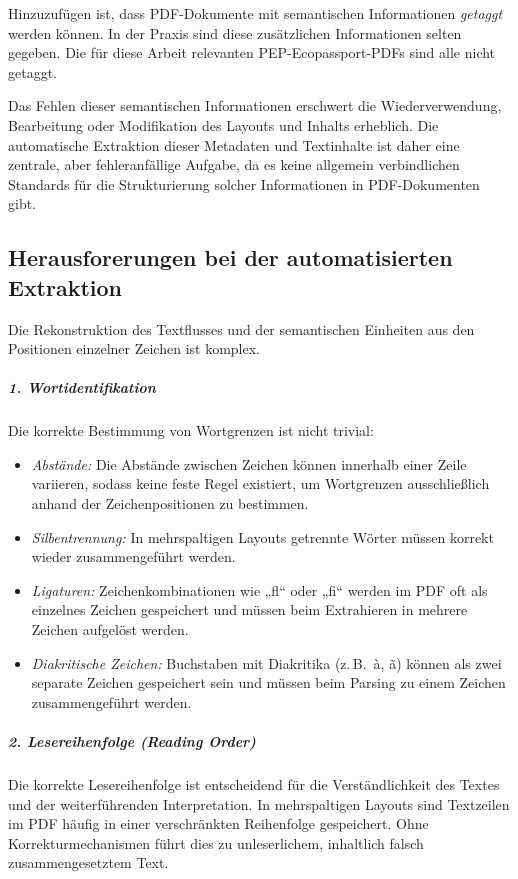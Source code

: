 Hinzuzufügen ist, dass PDF-Dokumente mit semantischen Informationen \emph{getaggt} werden können. In der Praxis sind diese zusätzlichen Informationen selten gegeben.
Die für diese Arbeit relevanten PEP-Ecopassport-PDFs sind alle nicht getaggt. \cite{Bast2017}

Das Fehlen dieser semantischen Informationen erschwert die Wiederverwendung, Bearbeitung oder Modifikation des Layouts und Inhalts erheblich. \cite{Corrêa2017}
Die automatische Extraktion dieser Metadaten und Textinhalte ist daher eine zentrale, aber fehleranfällige Aufgabe, da es keine 
allgemein verbindlichen Standards für die Strukturierung solcher Informationen in PDF-Dokumenten gibt. \cite{Lipinski2013}





\subsection{Herausforerungen bei der automatisierten Extraktion}

Die Rekonstruktion des Textflusses und der semantischen Einheiten aus den Positionen einzelner Zeichen ist komplex.

\subparagraph{1. Wortidentifikation}
Die korrekte Bestimmung von Wortgrenzen ist nicht trivial:
\begin{itemize}
    \item \emph{Abstände:} Die Abstände zwischen Zeichen können innerhalb einer Zeile variieren, sodass keine feste Regel existiert, 
    um Wortgrenzen ausschließlich anhand der Zeichenpositionen zu bestimmen. \cite{Bast2017}
    \item \emph{Silbentrennung:} In mehrspaltigen Layouts getrennte Wörter müssen korrekt wieder zusammengeführt werden. \cite{Bast2017}
    \item \emph{Ligaturen:} Zeichenkombinationen wie „fl“ oder „fi“ werden im PDF oft als einzelnes Zeichen gespeichert und 
    müssen beim Extrahieren in mehrere Zeichen aufgelöst werden. \cite{Lipinski2013}
    \item \emph{Diakritische Zeichen:} Buchstaben mit Diakritika (z.\,B.\ à, ã) können als zwei separate Zeichen gespeichert sein
    und müssen beim Parsing zu einem Zeichen zusammengeführt werden. \cite{Bast2017}
\end{itemize}

\subparagraph{2. Lesereihenfolge (Reading Order)}
Die korrekte Lesereihenfolge ist entscheidend für die Verständlichkeit des Textes und der weiterführenden Interpretation.  \cite{Bast2017}
In mehrspaltigen Layouts sind Textzeilen im PDF häufig in einer verschränkten Reihenfolge gespeichert. 
Ohne Korrekturmechanismen führt dies zu unleserlichem, inhaltlich falsch zusammengesetztem Text.\cite{Lovegrove1995}

